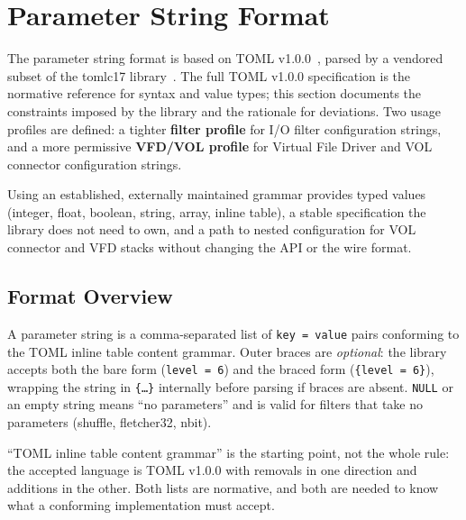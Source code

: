 \documentclass[../RFC-HDFG-2026-001.tex]{subfiles}
\begin{document}
\section{Parameter String Format}
\label{sec:param-format}

The parameter string format is based on TOML v1.0.0~\cite{toml10}, parsed by
a vendored subset of the tomlc17 library~\cite{tomlc17}.  The full TOML
v1.0.0 specification is the normative reference for syntax and value types;
this section documents the constraints imposed by the library and the
rationale for deviations.  Two usage profiles are defined: a tighter
\textbf{filter profile} for I/O filter configuration strings, and a more
permissive \textbf{VFD/VOL profile} for Virtual File Driver and VOL connector
configuration strings.

Using an established, externally maintained grammar provides typed values
(integer, float, boolean, string, array, inline table), a stable specification
the library does not need to own, and a path to nested configuration for VOL
connector and VFD stacks without changing the API or the wire format.

\subsection{Format Overview}
\label{sec:param-overview}

A parameter string is a comma-separated list of \texttt{key = value} pairs
conforming to the TOML inline table content grammar.  Outer braces are
\emph{optional}: the library accepts both the bare form
(\texttt{level = 6}) and the braced form (\texttt{\{level = 6\}}), wrapping
the string in \texttt{\{\ldots\}} internally before parsing if braces are
absent.  \texttt{NULL} or an empty string means ``no parameters'' and is
valid for filters that take no parameters (shuffle, fletcher32, nbit).

\label{sec:accepted-language}

``TOML inline table content grammar'' is the starting point, not the whole
rule: the accepted language is TOML v1.0.0 with removals in one direction
and additions in the other.  Both lists are normative, and both are needed
to know what a conforming implementation must accept.
\end{document}
